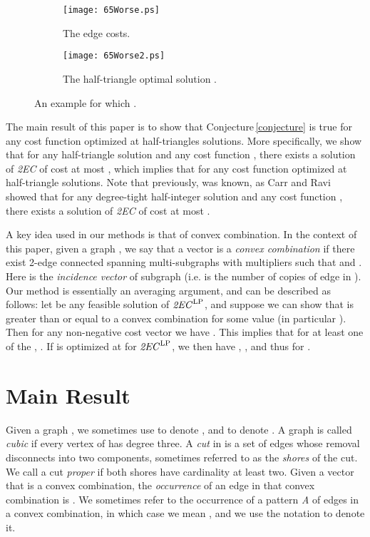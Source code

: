 \documentclass[oneeqnum,final]{siamltex1213}
\newcommand{\TwoEC}{\emph{2EC}}
\newcommand{\TwoECLP}{\ensuremath{\text{\TwoEC}^{\text{LP}}}}
\begin{document}
\begin{figure}
	\centering
	\begin{subfigure}[t]{0.45\textwidth}
		\vskip 0pt
		\centering
		\texttt{[image: 65Worse.ps]}
		\caption{The edge costs.}\label{65WorseCaseExample}
	\end{subfigure}
	\hfill
	\begin{subfigure}[t]{0.45\textwidth}
		\vskip 0pt
		\centering
		\texttt{[image: 65Worse2.ps]}
\caption{The half-triangle optimal solution .}\label{65WorseCaseExample2}
	\end{subfigure}
	\caption{An example for which \cite{alexander}.}
\end{figure}

The main result of this paper is to show that Conjecture\,\ref{conjecture} is true for any cost function optimized at half-triangles solutions. More specifically, we show that for any half-triangle solution  and any cost function , there exists a solution of \TwoEC{} of cost at most , which implies that  for any cost function optimized at half-triangle solutions. Note that previously,  was known, as Carr and Ravi\,\cite{carr} showed that for any degree-tight half-integer solution  and any cost function , there exists a solution of \TwoEC{} of cost at most .

A key idea used in our methods is that of convex combination. In the context of this paper, given a graph , we say that a vector  is a \emph{convex combination} if there exist 2-edge connected spanning multi-subgraphs  with multipliers  such that  and . Here  is the \emph{incidence vector} of subgraph  (i.e.  is the number of copies of edge  in ). Our method is essentially an averaging argument, and can be described as follows: let  be any feasible solution of \TwoECLP, and suppose we can show that  is greater than or equal to a convex combination for some value  (in particular ). Then for any non-negative cost vector  we have . This implies that for at least one of the , . If  is optimized at  for \TwoECLP, we then have , , and thus  for .

\section{Main Result}

Given a graph , we sometimes use  to denote , and  to denote . A graph  is called \emph{cubic} if every vertex of  has degree three. A \emph{cut} in  is a set of edges whose removal disconnects  into two components, sometimes referred to as the \emph{shores} of the cut. We call a cut \emph{proper} if both shores have cardinality at least two. Given a vector  that is a convex combination, the \emph{occurrence} of an edge  in that convex combination is . We sometimes refer to the occurrence of a pattern \emph{A} of edges in a convex combination, in which case we mean , and we use the notation  to denote it.
\end{document}
